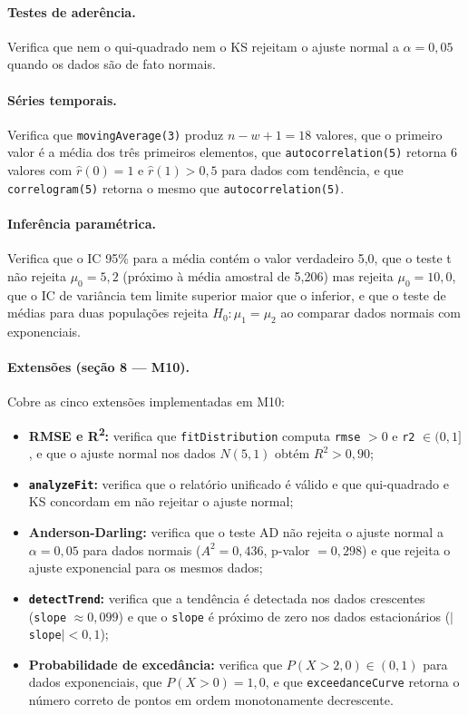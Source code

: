 \paragraph{Testes de aderência.} Verifica que nem o qui-quadrado nem o KS rejeitam o ajuste normal a $\alpha = 0{,}05$ quando os dados são de fato normais.

\paragraph{Séries temporais.} Verifica que \texttt{movingAverage(3)} produz $n - w + 1 = 18$ valores, que o primeiro valor é a média dos três primeiros elementos, que \texttt{autocorrelation(5)} retorna 6 valores com $\hat{r}(0) = 1$ e $\hat{r}(1) > 0{,}5$ para dados com tendência, e que \texttt{correlogram(5)} retorna o mesmo que \texttt{autocorrelation(5)}.

\paragraph{Inferência paramétrica.} Verifica que o IC 95\% para a média contém o valor verdadeiro 5,0, que o teste t não rejeita $\mu_0 = 5{,}2$ (próximo à média amostral de 5,206) mas rejeita $\mu_0 = 10{,}0$, que o IC de variância tem limite superior maior que o inferior, e que o teste de médias para duas populações rejeita $H_0: \mu_1 = \mu_2$ ao comparar dados normais com exponenciais.

\paragraph{Extensões (seção 8 --- M10).} Cobre as cinco extensões implementadas em M10:
\begin{itemize}
    \item \textbf{RMSE e R\textsuperscript{2}:} verifica que \texttt{fitDistribution} computa \texttt{rmse} $> 0$ e \texttt{r2} $\in (0, 1]$, e que o ajuste normal nos dados $N(5,1)$ obtém $R^2 > 0{,}90$;
    \item \textbf{\texttt{analyzeFit}:} verifica que o relatório unificado é válido e que qui-quadrado e KS concordam em não rejeitar o ajuste normal;
    \item \textbf{Anderson-Darling:} verifica que o teste AD não rejeita o ajuste normal a $\alpha = 0{,}05$ para dados normais ($A^2 = 0{,}436$, p-valor $= 0{,}298$) e que rejeita o ajuste exponencial para os mesmos dados;
    \item \textbf{\texttt{detectTrend}:} verifica que a tendência é detectada nos dados crescentes (\texttt{slope} $\approx 0{,}099$) e que o \texttt{slope} é próximo de zero nos dados estacionários ($|$\texttt{slope}$| < 0{,}1$);
    \item \textbf{Probabilidade de excedância:} verifica que $P(X > 2{,}0) \in (0,1)$ para dados exponenciais, que $P(X > 0) = 1{,}0$, e que \texttt{exceedanceCurve} retorna o número correto de pontos em ordem monotonamente decrescente.
\end{itemize}

